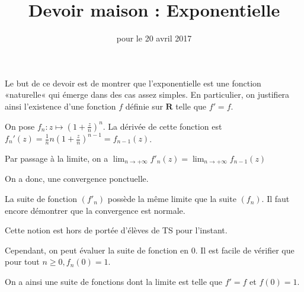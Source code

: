 \documentclass[11pt,a4paper,french]{article}
\title{Devoir maison \no 5 : Exponentielle}
\author{\bsc{Jumel}}
\date{pour le 20 avril 2017}
\makeatletter
\renewcommand{\maketitle}%
{\framebox{%
    \begin{minipage}{1.0\linewidth}%
      \begin{center}%
        \Large \@title ~-- \@author \\%
        \@date%
      \end{center}%
    \end{minipage}}%
  \normalsize%
}
\newcommand{\R}{\mathbf{R}}
\theoremstyle{break}
\theoremstyle{plain}
\theoremstyle{nonumberplain}
\theoremstyle{nonumberbreak}
\makeatother
\begin{document}
\noindent\maketitle

\bigskip

Le but de ce devoir est de montrer que l'exponentielle est une fonction
«naturelle« qui émerge dans des cas assez simples. En particulier, on
justifiera ainsi l'existence d'une fonction $f$ définie sur $\R$ telle
que $f' = f$.

On pose $f_n \colon z \mapsto \left( 1 + \frac{z}n \right)^n$. La
dérivée de cette fonction est $f_n'(z) = \frac{1}n n \left( 1 + \frac{z}n
\right)^{n-1} = f_{n-1}(z)$.

Par passage à la limite, on a $\lim_{n\to+\infty} f'_n (z) =
\lim_{n\to+\infty} f_{n-1} (z)$

On a donc, une convergence ponctuelle.

La suite de fonction $(f'_n)$ possède la même limite que la suite
$(f_n)$. Il faut encore démontrer que la convergence est normale.

Cette notion est hors de portée d'élèves de TS pour l'instant.


Cependant, on peut évaluer la suite de fonction en 0. Il est facile de
vérifier que pour tout $n \geqslant 0, f_n(0) = 1$.

On a ainsi une suite de fonctions dont la limite est telle que $f' = f$
et $f(0) = 1$.







\end{document}
